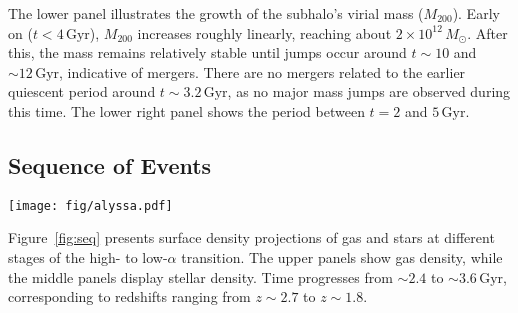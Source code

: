 \documentclass[twocolumn]{aastex631}
\newcommand{\Msun}{\ensuremath{M_{\odot}}}
\newcommand{\Gyr}{\ensuremath{\textrm{Gyr}}}
\begin{document}
The lower panel illustrates the growth of the subhalo's virial mass ($M_{200}$). Early on ($t<4\,\Gyr$), $M_{200}$ increases roughly linearly, reaching about $2 \times 10^{12}\,\Msun$. After this, the mass remains relatively stable until jumps occur around $t\sim10$ and $\sim12\,\Gyr$, indicative of mergers. There are no mergers related to the earlier quiescent period around $t\sim3.2\,\Gyr$, as no major mass jumps are observed during this time. The lower right panel shows the period between $t=2$ and $5\,\Gyr$.

\subsection{Sequence of Events}\label{ssec:sequence_of_events}
\begin{figure*}
  \centering
  \texttt{[image: fig/alyssa.pdf]}
  \caption{Surface density projections of gas (top row) and star particles (middle row) in our SoI across snapshots at different times during the high- to low-$\alpha$ transition. Below the projections is a plot showing the SFR, BH accretion rate (in units of $\dot{M}_{\textrm{BH}}/\dot{M}_{\textrm{edd}}$), and bar strength ($A_2/A_0$ for $R<2$ kpc). Time ranges from $\sim2.4\,\textrm{Gyr}$ to $\sim3.6\,\textrm{Gyr}$, corresponding to redshifts from $z\sim2.7$ to $z\sim1.8$. A sequence of events in which the bar strengthens, BH accretion increases, and SFR declines is seen, and is described more fully in the text.}
  \label{fig:seq}
\end{figure*}

Figure~\ref{fig:seq} presents surface density projections of gas and stars at different stages of the high- to low-$\alpha$ transition. The upper panels show gas density, while the middle panels display stellar density. Time progresses from $\sim2.4$ to $\sim3.6\,\textrm{Gyr}$, corresponding to redshifts ranging from $z\sim2.7$ to $z\sim1.8$.
\end{document}

